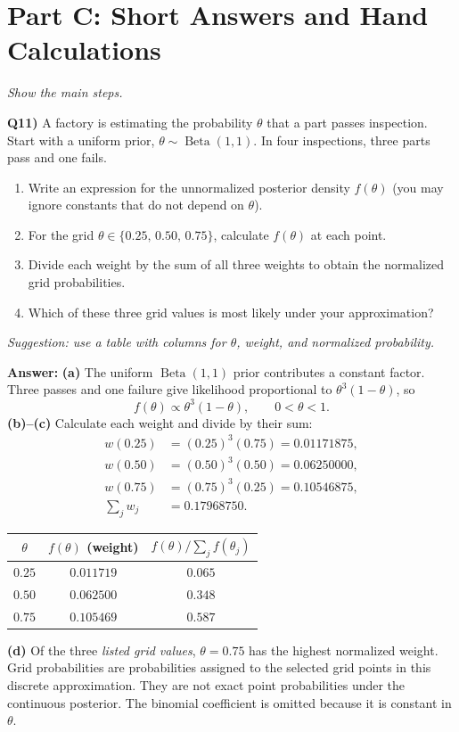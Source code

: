 \documentclass[12pt]{article}
\newenvironment{solution}{\par\smallskip\begingroup\color{blue}\noindent\textbf{Answer: }\smallskip}{\par\endgroup\medskip}
\newcommand{\question}[2]{\vspace{0.7em}\noindent\textbf{Q#1)}}
\begin{document}
\section*{Part C: Short Answers and Hand Calculations}
\textit{Show the main steps.}

\question{11}{}
A factory is estimating the probability $\theta$ that a part passes inspection. Start with a uniform prior, $\theta\sim\operatorname{Beta}(1,1)$. In four inspections, three parts pass and one fails.
\begin{enumerate}[label=(\alph*),nosep]
\item Write an expression for the unnormalized posterior density $f(\theta)$ (you may ignore constants that do not depend on $\theta$).
\item For the grid $\theta\in\{0.25,\,0.50,\,0.75\}$, calculate $f(\theta)$ at each point.
\item Divide each weight by the sum of all three weights to obtain the normalized grid probabilities.
\item Which of these three grid values is most likely under your approximation?
\end{enumerate}
\textit{Suggestion: use a table with columns for $\theta$, weight, and normalized probability.}

\begin{solution}
\textbf{(a)} The uniform $\operatorname{Beta}(1,1)$ prior contributes a constant factor. Three passes and one failure give likelihood proportional to $\theta^3(1-\theta)$, so
\[f(\theta)\propto \theta^3(1-\theta),\qquad 0<\theta<1.\]
\textbf{(b)--(c)} Calculate each weight and divide by their sum:
\[
\begin{aligned}
w(0.25)&=(0.25)^3(0.75)=0.01171875,\\
w(0.50)&=(0.50)^3(0.50)=0.06250000,\\
w(0.75)&=(0.75)^3(0.25)=0.10546875,\\
\sum_j w_j&=0.17968750.
\end{aligned}
\]
\begin{center}
\begin{tabular}{ccc}
\toprule
$\theta$ & $f(\theta)$ (weight) & $f(\theta)/\sum_j f(\theta_j)$\\
\midrule
$0.25$ & $0.011719$ & $0.065$\\
$0.50$ & $0.062500$ & $0.348$\\
$0.75$ & $0.105469$ & $0.587$\\
\bottomrule
\end{tabular}
\end{center}
\textbf{(d)} Of the three \emph{listed grid values}, $\boxed{\theta=0.75}$ has the highest normalized weight.
Grid probabilities are probabilities assigned to the selected grid points in this discrete approximation. They are not exact point probabilities under the continuous posterior. The binomial coefficient is omitted because it is constant in $\theta$.
\end{solution}
\end{document}
